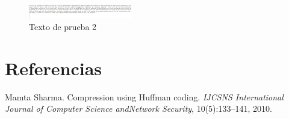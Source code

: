 \documentclass{IEEEtran}
\begin{document}
\begin{figure}[!ht]
  \caption{Texto de prueba 2}
  \centering
    \includegraphics[width=0.4\textwidth]{Prueba_6.png}
\end{figure}

\section{Referencias}

\begin{thebibliography}{99}

 Mamta  Sharma.   Compression  using  Huffman  coding. \emph{IJCSNS International Journal of Computer Science andNetwork Security}, 10(5):133–141, 2010.
\end{thebibliography}
\end{document}
